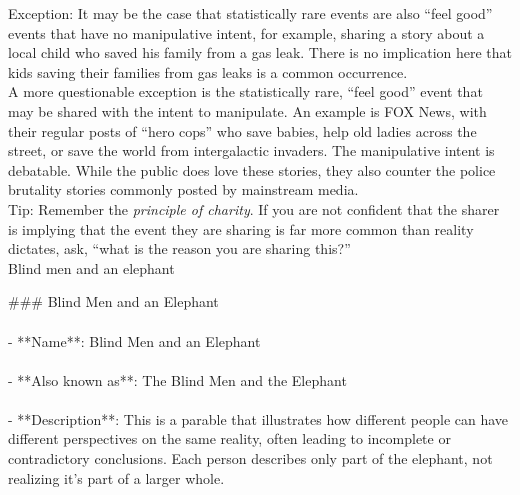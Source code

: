 \documentclass[a4paper,12pt,single,pdftex]{scrbook}
\begin{document}
    
      Exception: It may be the case that statistically rare events are also “feel good” events that have no manipulative intent, for example, sharing a story about a local child who saved his family from a gas leak. There is no implication here that kids saving their families from gas leaks is a common occurrence.
    \\

    
      A more questionable exception is the statistically rare, “feel good” event that may be shared with the intent to manipulate. An example is FOX News, with their regular posts of “hero cops” who save babies, help old ladies across the street, or save the world from intergalactic invaders. The manipulative intent is debatable. While the public does love these stories, they also counter the police brutality stories commonly posted by mainstream media. 
    \\

    
      Tip: Remember the {\em principle of charity}. If you are not confident that the sharer is implying that the event they are sharing is far more common than reality dictates, ask, “what is the reason you are sharing this?”
    \\

  

Blind men and an elephant
    
      \#\#\# Blind Men and an Elephant
    \\

    
      
    \\

    
      - **Name**: Blind Men and an Elephant
    \\

    
      
    \\

    
      - **Also known as**: The Blind Men and the Elephant
    \\

    
      
    \\

    
      - **Description**: This is a parable that illustrates how different people can have different perspectives on the same reality, often leading to incomplete or contradictory conclusions. Each person describes only part of the elephant, not realizing it's part of a larger whole.
    \\
\end{document}
